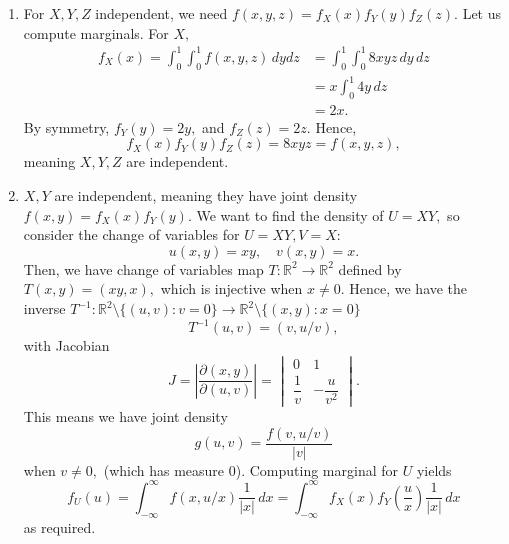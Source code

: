\documentclass[12pt]{article}
\begin{document}
\begin{enumerate}
  \item For $X,Y, Z$ independent, we need $f(x, y, z) = f_X(x) f_Y(y)
    f_Z(z).$ Let us compute marginals. For $X,$
    \begin{align*}
      f_X(x) = \int_{0}^{1} \int_{0}^{1} f(x, y, z) \, dy dz &=
      \int_{0}^{1} \int_{0}^{1} 8xyz \, dy \, dz \\
      &= x \int_{0}^{1} 4y \, dz \\
      &= 2x .
    \end{align*}
    By symmetry, $f_Y(y) = 2y, $ and $f_Z(z) = 2z.$ Hence,
    $$
    f_X(x) f_Y(y) f_Z(z) = 8xyz = f(x, y, z),
    $$
    meaning $X, Y, Z$ are independent.

  \item $X, Y$ are independent, meaning they have joint density $f(x,
    y ) = f_X(x) f_Y(y).$ We want to find the density of $U = XY,$ so
    consider the change of variables for $U = XY, V = X$:
    $$
    u(x, y) = xy, \quad v(x, y) =x .
    $$
    Then, we have change of variables map $T : \mathbb R^{2} \to
    \mathbb R^{2}$ defined by $T(x, y) = (xy, x),$ which is injective
    when $x \neq  0.$ Hence, we have the inverse
    $T^{-1}: \mathbb R^2 \setminus \{(u, v) : v = 0\} \to \mathbb R^2
    \setminus \{(x, y) : x = 0\}$
    $$
    T^{-1}(u, v) = ( v, u / v),
    $$
    with Jacobian
    $$
    J = \left|\dfrac{\partial (x, y)}{\partial (u, v)}\right| =
    \begin{vmatrix}
      0 & 1 \\
      \dfrac{1}{v} & -\dfrac{u}{v^2}
    \end{vmatrix}.
    $$
    This means we have joint density
    $$
    g(u, v) = \dfrac{f(v, u/v)}{|v|}
    $$
    when $v \neq 0,$ (which has measure $0$). Computing marginal for
    $U$ yields $$
    f_U(u) = \int_{-\infty}^{\infty} f(x, u/x) \dfrac{1}{|x|} \, dx =
    \int_{-\infty}^{\infty} f_X(x) f_Y\left(\dfrac{u}{x}\right)
    \dfrac{1}{|x|} \, dx
    $$
    as required.


\end{enumerate}
\end{document}
